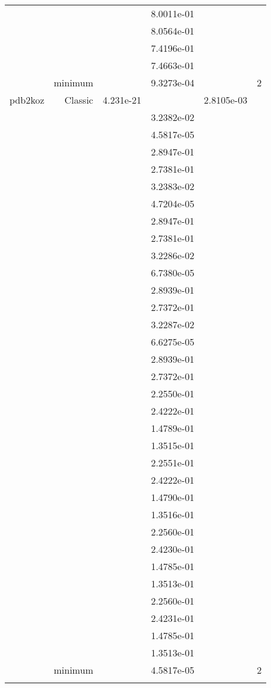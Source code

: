 \begin{xltabular}{\textwidth}{r|rS[table-format=1.3e+2]S[table-format=1.4e+2]S[table-format=1.4e+2]S[table-format=-1.5]}
&  &  & 8.0011e-01 & & \\
&  &  & 8.0564e-01 & & \\
&  &  & 7.4196e-01 & & \\
&  &  & 7.4663e-01 & & \\
& minimum &  & 9.3273e-04 & & 2 \\  \addlinespace
pdb2koz & Classic & 4.231e-21 &  & 2.8105e-03 & \\
&  &  & 3.2382e-02 & & \\
&  &  & 4.5817e-05 & & \\
&  &  & 2.8947e-01 & & \\
&  &  & 2.7381e-01 & & \\
&  &  & 3.2383e-02 & & \\
&  &  & 4.7204e-05 & & \\
&  &  & 2.8947e-01 & & \\
&  &  & 2.7381e-01 & & \\
&  &  & 3.2286e-02 & & \\
&  &  & 6.7380e-05 & & \\
&  &  & 2.8939e-01 & & \\
&  &  & 2.7372e-01 & & \\
&  &  & 3.2287e-02 & & \\
&  &  & 6.6275e-05 & & \\
&  &  & 2.8939e-01 & & \\
&  &  & 2.7372e-01 & & \\
&  &  & 2.2550e-01 & & \\
&  &  & 2.4222e-01 & & \\
&  &  & 1.4789e-01 & & \\
&  &  & 1.3515e-01 & & \\
&  &  & 2.2551e-01 & & \\
&  &  & 2.4222e-01 & & \\
&  &  & 1.4790e-01 & & \\
&  &  & 1.3516e-01 & & \\
&  &  & 2.2560e-01 & & \\
&  &  & 2.4230e-01 & & \\
&  &  & 1.4785e-01 & & \\
&  &  & 1.3513e-01 & & \\
&  &  & 2.2560e-01 & & \\
&  &  & 2.4231e-01 & & \\
&  &  & 1.4785e-01 & & \\
&  &  & 1.3513e-01 & & \\
& minimum &  & 4.5817e-05 & & 2 \\  \addlinespace

\end{xltabular}

